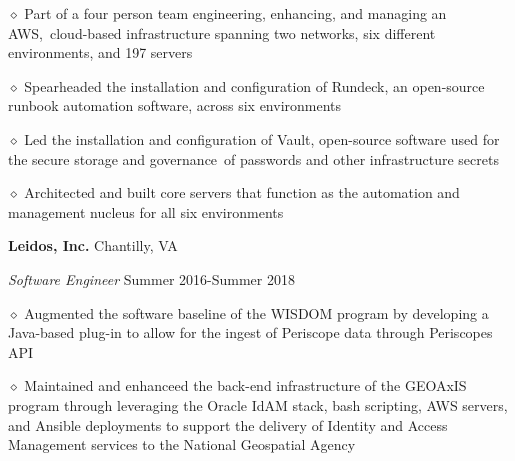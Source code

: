 \documentclass[executivepaper]{extarticle}
\begin{document}
\begin{center}
{\begin{minipage}{7.0in}
{\noindent $\diamond$ {\fontsize{12}{8}\selectfont Part of a four person team engineering, enhancing, and managing an AWS, cloud-based infrastructure spanning two networks, six different environments, and 197 servers}}

\vspace{0.25mm}

{\noindent $\diamond$ {\fontsize{12}{8}\selectfont Spearheaded the installation and configuration of Rundeck, an open-source runbook automation software, across six environments}}

\vspace{0.25mm}

{\noindent $\diamond$ {\fontsize{12}{8}\selectfont Led the installation and configuration of Vault, open-source software used for the secure storage and governance of passwords and other infrastructure secrets}}

\vspace{0.25mm}

{\noindent $\diamond$ {\fontsize{12}{8}\selectfont Architected and built core servers that function as the automation and management nucleus for all six environments}}

\vspace{2mm}

{\noindent \textbf{\fontsize{12}{8}\selectfont Leidos, Inc.}} {\hfill \fontsize{10}{8}\selectfont Chantilly, VA}

\vspace{0.25mm}

{\noindent \textit{\fontsize{12}{8}\selectfont Software Engineer}} {\hfill \fontsize{10}{8}\selectfont Summer 2016-Summer 2018}

\vspace{0.25mm}

{\noindent $\diamond$ {\fontsize{12}{8}\selectfont Augmented the software baseline of the WISDOM program by developing a Java-based plug-in to allow for the ingest of Periscope data through Periscope\textsc{}s API}}

\vspace{0.25mm}

{\noindent $\diamond$ {\fontsize{12}{8}\selectfont Maintained and enhanceed the back-end infrastructure of the GEOAxIS program through leveraging the Oracle IdAM stack, bash scripting, AWS servers, and Ansible deployments to support the delivery of Identity and Access Management services to the National Geospatial Agency}}

\vspace{0.25mm}


\end{minipage}}
\end{center}
\end{document}
